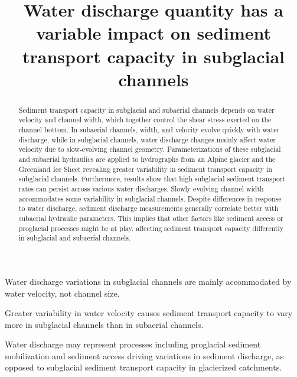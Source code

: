 \documentclass[draft]{agujournal2019}
\begin{document}
\title{Water discharge quantity has a variable impact on sediment transport capacity in subglacial channels}


  



\begin{keypoints}
\item Water discharge variations in subglacial channels are mainly accommodated by water velocity, not channel size.
\item Greater variability in water velocity causes sediment transport capacity to vary more in subglacial channels than in subaerial channels.
\item Water discharge may represent processes including proglacial sediment mobilization and sediment access driving variations in sediment discharge, as opposed to subglacial sediment transport capacity in glacierized catchments.
\end{keypoints}

\begin{abstract}
  Sediment transport capacity in subglacial and subaerial channels depends on  water velocity and channel width, which together control the shear stress exerted on the channel bottom.
  In subaerial channels, width, and velocity evolve quickly with water discharge, while in subglacial channels, water discharge changes mainly affect water velocity due to slow-evolving channel geometry.
  Parameterizations of these subglacial and subaerial hydraulics are applied to hydrographs from an Alpine glacier and the Greenland Ice Sheet revealing greater variability in sediment transport capacity in subglacial channels.
  Furthermore, results show that high subglacial sediment transport rates can persist across various water discharges.
  Slowly evolving channel width accommodates some variability in subglacial channels.
  Despite differences in response to water discharge, sediment discharge measurements generally correlate better with subaerial hydraulic parameters.
  This implies that other factors like sediment access or proglacial processes might be at play, affecting sediment transport capacity differently in subglacial and subaerial channels.
\end{abstract}
\end{document}
